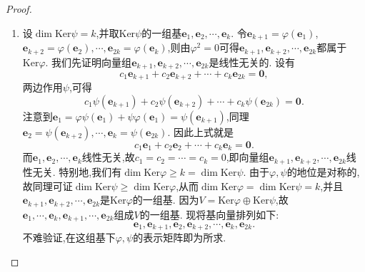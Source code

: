 \documentclass[../../main.tex]{subfiles}
\begin{document}
\begin{proof}
\begin{enumerate}[(1)]
\item 设\(\dim\text{Ker}\psi=k\),并取\(\text{Ker}\psi\)的一组基\(\boldsymbol{e}_1,\boldsymbol{e}_2,\cdots,\boldsymbol{e}_k\). 令\(\boldsymbol{e}_{k + 1}=\varphi(\boldsymbol{e}_1)\),\(\boldsymbol{e}_{k + 2}=\varphi(\boldsymbol{e}_2),\cdots,\boldsymbol{e}_{2k}=\varphi(\boldsymbol{e}_k)\),则由\(\varphi^2 = 0\)可得\(\boldsymbol{e}_{k + 1},\boldsymbol{e}_{k + 2},\cdots,\boldsymbol{e}_{2k}\)都属于\(\text{Ker}\varphi\). 我们先证明向量组\(\boldsymbol{e}_{k + 1},\boldsymbol{e}_{k + 2},\cdots,\boldsymbol{e}_{2k}\)是线性无关的. 设有
\[
c_1\boldsymbol{e}_{k + 1}+c_2\boldsymbol{e}_{k + 2}+\cdots + c_k\boldsymbol{e}_{2k}=\boldsymbol{0},
\]
两边作用\(\psi\),可得
\[
c_1\psi(\boldsymbol{e}_{k + 1})+c_2\psi(\boldsymbol{e}_{k + 2})+\cdots + c_k\psi(\boldsymbol{e}_{2k})=\boldsymbol{0}.
\]
注意到\(\boldsymbol{e}_1=\varphi\psi(\boldsymbol{e}_1)+\psi\varphi(\boldsymbol{e}_1)=\psi(\boldsymbol{e}_{k + 1})\),同理\(\boldsymbol{e}_2=\psi(\boldsymbol{e}_{k + 2}),\cdots,\boldsymbol{e}_k=\psi(\boldsymbol{e}_{2k})\). 因此上式就是
\[
c_1\boldsymbol{e}_1+c_2\boldsymbol{e}_2+\cdots + c_k\boldsymbol{e}_k=\boldsymbol{0}.
\]
而\(\boldsymbol{e}_1,\boldsymbol{e}_2,\cdots,\boldsymbol{e}_k\)线性无关,故\(c_1 = c_2=\cdots = c_k = 0\),即向量组\(\boldsymbol{e}_{k + 1},\boldsymbol{e}_{k + 2},\cdots,\boldsymbol{e}_{2k}\)线性无关. 特别地,我们有\(\dim\text{Ker}\varphi\geqslant  k=\dim\text{Ker}\psi\). 由于\(\varphi,\psi\)的地位是对称的,故同理可证\(\dim\text{Ker}\psi\geqslant \dim\text{Ker}\varphi\),从而\(\dim\text{Ker}\varphi=\dim\text{Ker}\psi = k\),并且\(\boldsymbol{e}_{k + 1},\boldsymbol{e}_{k + 2},\cdots,\boldsymbol{e}_{2k}\)是\(\text{Ker}\varphi\)的一组基. 因为\(V=\text{Ker}\varphi\oplus\text{Ker}\psi\),故\(\boldsymbol{e}_1,\cdots,\boldsymbol{e}_k,\boldsymbol{e}_{k + 1},\cdots,\boldsymbol{e}_{2k}\)组成\(V\)的一组基. 现将基向量排列如下:
\[
\boldsymbol{e}_1,\boldsymbol{e}_{k + 1},\boldsymbol{e}_2,\boldsymbol{e}_{k + 2},\cdots,\boldsymbol{e}_k,\boldsymbol{e}_{2k}.
\]
不难验证,在这组基下\(\varphi,\psi\)的表示矩阵即为所求.
\end{enumerate}

\end{proof}
\end{document}
